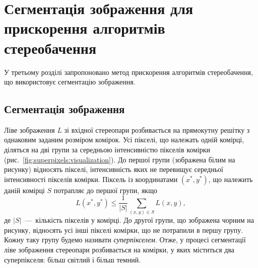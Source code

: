 \chapter{Сегментація зображення для прискорення алгоритмів стереобачення}

У третьому розділі запропоновано метод прискорення алгоритмів стереобачення,
що використовує сегментацію зображення.

\section{Сегментація зображення}

Ліве зображення $L$ зі вхідної стереопари
розбивається на прямокутну решітку з однаковим заданим розміром комірок.
Усі пікселі, що належать одній комірці,
діляться на дві групи за середньою інтенсивністю пікселів комірки
(рис.~\ref{fig:superpixels:visualization}).
До першої групи (зображена білим на рисунку) відносять пікселі,
інтенсивність яких не перевищує середньої інтенсивності пікселів комірки.
Піксель із координатами $\left(x^*, y^* \right)$, що належить даній комірці $S$
потрапляє до першої групи, якщо
\begin{equation*}
    L \left(x^*, y^* \right) \le
        \frac{1}{ \left| S \right| }
        \sum \limits_{\left(x, y \right) \in S} L \left(x, y \right),
\end{equation*}
де $ \left| S \right|$~---~кількість пікселів у комірці.
До другої групи, що зображена чорним на рисунку,
відносять усі інші пікселі комірки, що не потрапили в першу групу.
Кожну таку групу будемо називати \textit{суперпікселем}.
Отже, у процесі сегментації ліве зображення
стереопари розбивається на комірки, у яких міститься два суперпікселя:
більш світлий і більш темний.

